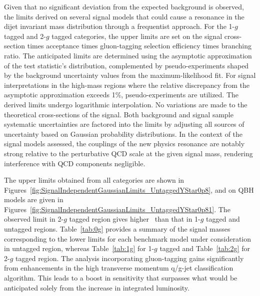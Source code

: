 

Given that no significant deviation from the expected background is observed, the limits derived on several signal models that could cause a resonance in the dijet invariant mass distribution through a frequentist approach. For the 1-$g$ tagged and 2-$g$ tagged categories, the upper limits are set on the signal cross-section times acceptance times gluon-tagging selection efficiency times branching ratio.  The anticipated limits are determined using the asymptotic approximation of the test statistic's distribution, complemented by pseudo-experiments shaped by the background uncertainty values from the maximum-likelihood fit. For signal interpretations in the high-mass regions where the relative discrepancy from the asymptotic approximation exceeds 1\%, pseudo-experiments are utilized. The derived limits undergo logarithmic interpolation. No variations are made to the theoretical cross-sections of the signal. Both background and signal sample systematic uncertainties are factored into the limits by adjusting all sources of uncertainty based on Gaussian probability distributions. In the context of the signal models assessed, the couplings of the new physics resonance are notably strong relative to the perturbative QCD scale at the given signal mass, rendering interference with QCD components negligible.


The upper limits obtained from all categories are shown in Figures~\ref{fig:SignalIndependentGaussianLimits_UntaggedYStar0p8}, and on QBH models are given in Figures~\ref{fig:SignalIndependentGaussianLimits_UntaggedYStar0p81}. The observed limit in 2-$g$ tagged region gives higher \mjj\ than that in 1-$g$ tagged and untagged regions. Table~\ref{tab:0g} provides a summary of the signal masses corresponding to the lower limits for each benchmark model under consideration in untagged region, whereas Table~\ref{tab:1g} for 1-$g$ tagged and Table~\ref{tab:2g} for  2-$g$ tagged region. The analysis incorporating gluon-tagging gains significantly from enhancements in the high transverse momentum q/g-jet classification algorithm. This leads to a boost in sensitivity that surpasses what would be anticipated solely from the increase in integrated luminosity.




